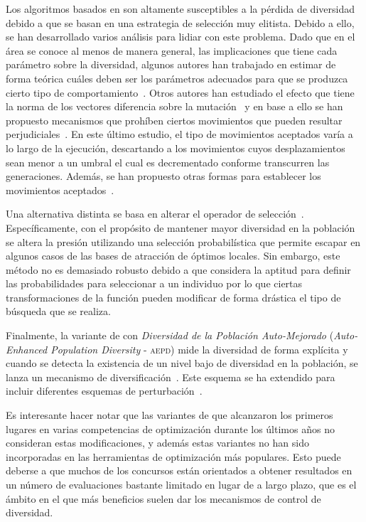 Los algoritmos basados en \DE{} son altamente susceptibles a la pérdida de diversidad debido a que se basan en una estrategia de selección muy elitista.
%
Debido a ello, se han desarrollado varios análisis para lidiar con este problema.
%
Dado que en el área se conoce al menos de manera general, las implicaciones que tiene cada parámetro sobre la diversidad, algunos autores han trabajado
en estimar de forma teórica cuáles deben ser los parámetros adecuados para que se produzca cierto tipo de comportamiento~\cite{zaharie2003control}.
%
Otros autores han estudiado el efecto que tiene la norma de los vectores diferencia sobre la mutación~\cite{montgomery2009differential} y en base
a ello se han propuesto mecanismos que prohíben ciertos movimientos que pueden resultar perjudiciales~\cite{montgomery2012simple}.
%
En este último estudio, el tipo de movimientos aceptados varía a lo largo de la ejecución, descartando a los movimientos cuyos desplazamientos sean menor
a un umbral el cual es decrementado conforme transcurren las generaciones.
%
Además, se han propuesto otras formas para establecer los movimientos aceptados~\cite{bolufe2013differential}.

Una alternativa distinta se basa en alterar el operador de selección~\cite{sa2008exploration}.
%
Específicamente, con el propósito de mantener mayor diversidad en la población se altera la presión utilizando una selección probabilística que
permite escapar en algunos casos de las bases de atracción de óptimos locales.
%
Sin embargo, este método no es demasiado robusto debido a que considera la aptitud para definir las probabilidades para seleccionar a un individuo por lo que ciertas 
transformaciones de la función pueden modificar de forma drástica el tipo de búsqueda que se realiza.

Finalmente, la variante de \DE{} con \textit{Diversidad de la Población Auto-Mejorado} (\textit{Auto-Enhanced Population Diversity} - \textsc{aepd}) 
mide la diversidad de forma explícita y cuando se detecta la existencia de un nivel bajo de diversidad en la población, se 
lanza un mecanismo de diversificación~\cite{yang2015differential}.
%
Este esquema se ha extendido para incluir diferentes esquemas de perturbación~\cite{zhao2016differential}.

Es interesante hacer notar que las variantes de \DE{} que alcanzaron los primeros lugares en varias competencias de optimización durante los últimos años
no consideran estas modificaciones, y además estas variantes no han sido incorporadas en las herramientas de optimización más populares.
%
Esto puede deberse a que muchos de los concursos están orientados a obtener resultados en un número de evaluaciones bastante limitado en lugar de a largo plazo,
que es el ámbito en el que más beneficios suelen dar los mecanismos de control de diversidad.


